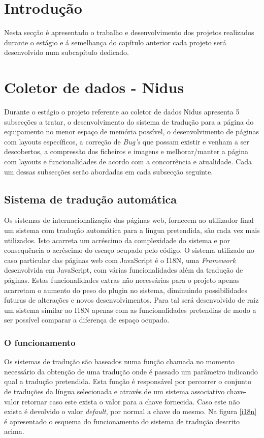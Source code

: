 \section{Introdução}
Nesta secção é apresentado o trabalho e desenvolvimento dos projetos realizados durante o estágio e á semelhança do capítulo anterior cada projeto será desenvolvido num subcapítulo dedicado.

\section{Coletor de dados - Nidus} 
\par Durante o estágio o projeto referente ao coletor de dados Nidus apresenta 5 subsecções a tratar, o desenvolvimento do sistema de tradução para a página do equipamento no menor espaço de memória possível, o desenvolvimento de páginas com layouts específicos, a correção de \textit{Bug's} que possam existir e venham a ser descobertos, a compressão dos ficheiros e imagens e melhorar/manter a página com layouts e funcionalidades de acordo com a concorrência e atualidade. Cada um dessas subsecções serão abordadas em cada subsecção seguinte.

\subsection{Sistema de tradução automática}
\par Os sistemas de internacionalização das páginas web, fornecem ao utilizador final um sistema com tradução automática para a língua pretendida, são cada vez mais utilizados. Isto acarreta um acréscimo da complexidade do sistema e por consequência o acréscimo do escaço ocupado pelo código. O sistema utilizado no caso particular das páginas web com JavaScript é o I18N, uma \textit{Framework} desenvolvida em JavaScript, com várias funcionalidades além da tradução de páginas. Estas funcionalidades extras não necessárias para o projeto apenas acarretam o aumento do peso do plugin no sistema, diminuindo possibilidades futuras de alterações e novos desenvolvimentos. Para tal será desenvolvido de raiz um sistema similar ao I18N apenas com as funcionalidades pretendias de modo a ser possível comparar a diferença de espaço ocupado.


\subsubsection{O funcionamento}
\par Os sistemas de tradução são baseados numa função chamada no momento necessário da obtenção de uma tradução onde é passado um parâmetro indicando qual a tradução pretendida. Esta função é responsável por percorrer o conjunto de traduções da língua selecionada e através de um sistema associativo chave-valor retornar caso este exista o valor para a chave fornecida. Caso este não exista é devolvido o valor \textit{default}, por normal a chave do mesmo. Na figura \ref{i18n} é apresentado o esquema do funcionamento do sistema de tradução descrito acima.

